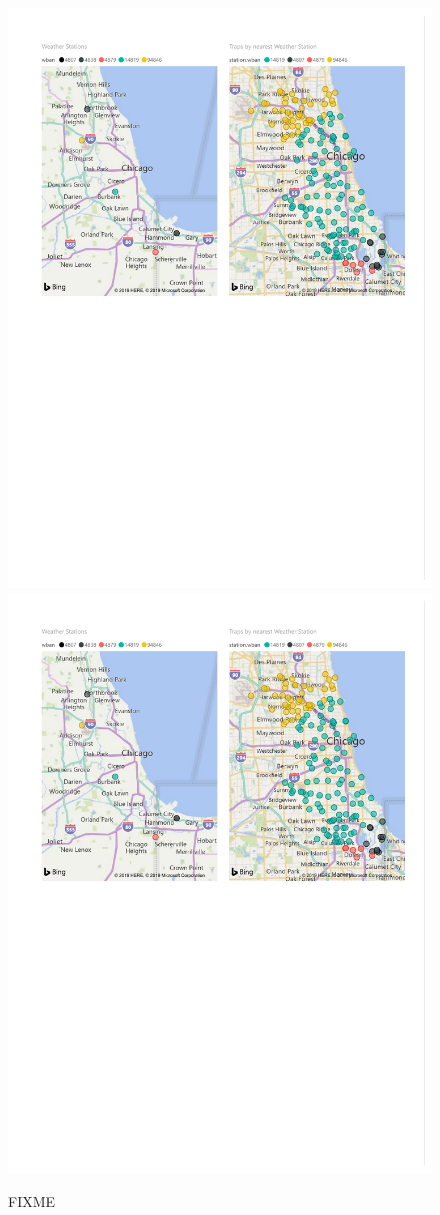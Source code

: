 \begin{figure}[htb]
	\centering
	\includegraphics[width=0.4\columnwidth]{images/WeatherStations}
	\includegraphics[width=0.4\columnwidth]{images/TrapsByNN}
	\caption{FIXME }
	\label{fig:weather-stations}
\end{figure}